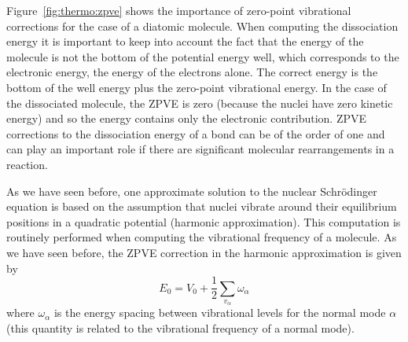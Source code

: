 \documentclass[../Main/chem371-notes.tex]{subfiles}
\begin{document}

Figure~\ref{fig:thermo:zpve} shows the importance of zero-point vibrational corrections for the case of a diatomic molecule.
When computing the dissociation energy it is important to keep into account the fact that the energy of the molecule is not the bottom of the potential energy well, which corresponds to the electronic energy, the energy of the electrons alone.
The correct energy is the bottom of the well energy plus the zero-point vibrational energy.
In the case of the dissociated molecule, the ZPVE is zero (because the nuclei have zero kinetic energy) and so the energy contains only the electronic contribution.
ZPVE corrections to the dissociation energy of a bond can be of the order of one \kcal and can play an important role if there are significant molecular rearrangements in a reaction.

As we have seen before, one approximate solution to the nuclear Schr\"{o}dinger equation is based on the assumption that nuclei vibrate around their equilibrium positions in a quadratic potential (harmonic approximation).
This computation is routinely performed when computing the vibrational frequency of a molecule.
As we have seen before, the ZPVE correction in the harmonic approximation is given by
\begin{equation}
\label{eq:thermochemistry:zpve}
E_0 = V_0 + \frac{1}{2}  \sum_{v_\alpha} \omega_\alpha
\end{equation}
where $\omega_\alpha$ is the energy spacing between vibrational levels for the normal mode $\alpha$ (this quantity is related to the vibrational frequency of a normal mode).
\end{document}
